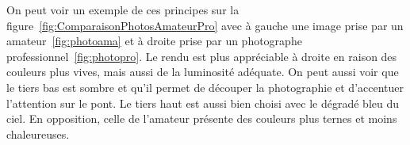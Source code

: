 \documentclass[11pt, french]{report-rd-info}
\begin{document}
On peut voir un exemple de ces principes sur la figure~\ref{fig:ComparaisonPhotosAmateurPro} avec à gauche une image prise par un amateur~\ref{fig:photoama} et à droite prise par un photographe professionnel~\ref{fig:photopro}. Le rendu est plus appréciable à droite en raison des couleurs plus vives, mais aussi de la luminosité adéquate. On peut aussi voir que le tiers bas est sombre et qu’il permet de découper la photographie et d’accentuer l’attention sur le pont. Le tiers haut est aussi bien choisi avec le dégradé bleu du ciel. En opposition, celle de l’amateur présente des couleurs plus ternes et moins chaleureuses.

\begin{figure}[htp]
  \centering

\end{figure}
\end{document}
